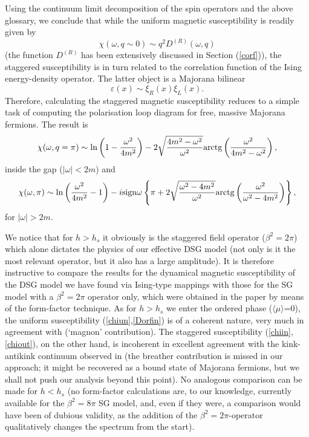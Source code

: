 Using the continuum limit decomposition of
the spin operators and the above glossary,
we conclude that while the uniform magnetic susceptibility
is readily given by
\begin{equation}
\chi(\omega, q\sim 0)\sim q^2 D^{(R)}(\omega, q)
\label{chiun}
\end{equation}
(the function $D^{(R)}$ has been extensively
discussed in Section (\ref{corf})),
the staggered susceptibility is in turn related to the
correlation function of the Ising energy-density operator.
The latter object is a Majorana bilinear
\[
\varepsilon(x)\sim \xi_R(x)\xi_L(x).
\]
Therefore, calculating the staggered magnetic susceptibility
reduces to a simple task of computing the polarisation
loop diagram for free, massive Majorana fermions.
The result is
\begin{equation}
\chi(\omega, q=\pi)\sim
\ln\left(1-\frac{\omega^2}{4m^2}
\right)-2\sqrt{\frac{4m^2-\omega^2}{\omega^2}}
{\rm arctg}\left(
\frac{\omega^2}{4m^2-\omega^2}\right),
\label{chiin}
\end{equation}
inside the gap ($|\omega|<2m$) and
\begin{equation}
\chi(\omega,\pi)\sim
\ln\left(\frac{\omega^2}{4m^2}-1
\right)
-i{\rm sign}\omega\left\{\pi+
2\sqrt{\frac{\omega^2-4m^2}{\omega^2}}
{\rm arctg}\left(
\frac{\omega^2}{\omega^2-4m^2}\right)\right\},
\label{chiout}
\end{equation}
for $|\omega|>2m$.

We notice that for $h>h_s$ it obviously is the
staggered field operator ($\beta^2=2\pi$) which alone
dictates the physics of our effective DSG
model (not only is it the most relevant
operator, but it also has a large amplitude).
It is therefore instructive to compare
the results for the dynamical magnetic
susceptibility of the DSG model we
have found via Ising-type mappings with
those for the SG model with a $\beta^2=2\pi$
operator only, which were obtained in the
paper \cite{ETD} by means of the
form-factor technique.
As for $h>h_s$ we enter the ordered phase ($\langle
\mu\rangle$=0), the uniform
susceptibility (\ref{chiun},\ref{Dorfin})
is of a coherent nature, very much
in agreement with \cite{ETD} (`magnon'
contribution). The staggered susceptibility
(\ref{chiin},\ref{chiout}), on the other
hand, is incoherent in excellent agreement
with the kink-antikink continuum observed
in \cite{ETD} (the breather contribution
is missed in our approach; it might be
recovered as a bound state of Majorana
fermions, but we shall not push our analysis
beyond this point).
No analogous comparison can be made for $h<h_s$
(no form-factor calculations are, to our
knowledge, currently available for the
$\beta^2=8\pi$ SG model, and, even if they were,
a comparison would have been of dubious validity,
as the addition of the $\beta^2=2\pi$-operator
qualitatively changes the spectrum from the
start).

